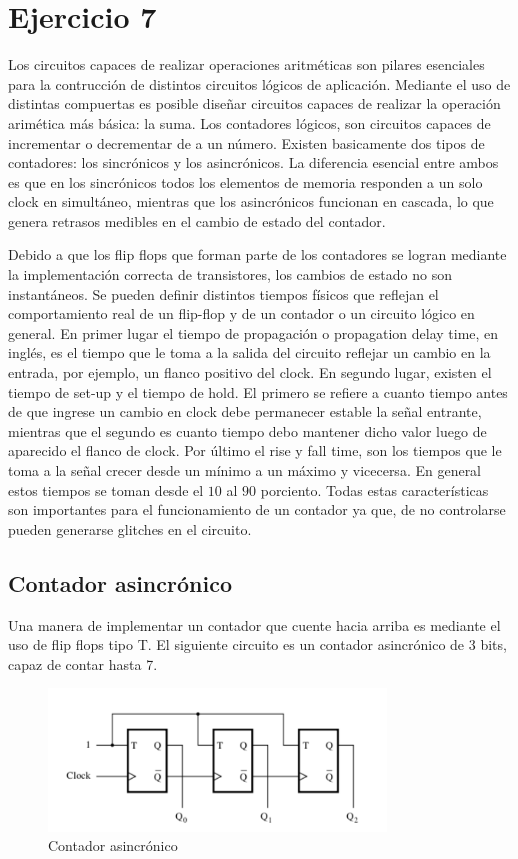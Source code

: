 \section{Ejercicio 7}
Los circuitos capaces de realizar operaciones aritméticas son pilares esenciales para la contrucción de distintos circuitos lógicos de aplicación. Mediante el uso de distintas compuertas es posible diseñar circuitos capaces de realizar la operación arimética más básica: la suma. Los contadores lógicos, son circuitos capaces de incrementar o decrementar de a un número. Existen basicamente dos tipos de contadores: los sincrónicos y los asincrónicos. La diferencia esencial entre ambos es que en los sincrónicos todos los elementos de memoria responden a un solo clock en simultáneo, mientras que los asincrónicos funcionan en cascada, lo que genera retrasos medibles en el cambio de estado del contador. 


Debido a que los flip flops que forman parte de los contadores se logran mediante la implementación correcta de transistores, los cambios de estado no son instantáneos. Se pueden definir distintos tiempos físicos que reflejan el comportamiento real de un flip-flop y de un contador o un circuito lógico en general. En primer lugar el tiempo de propagación o propagation delay time, en inglés, es el tiempo que le toma a la salida del circuito reflejar un cambio en la entrada, por ejemplo, un flanco positivo del clock. En segundo lugar, existen el tiempo de set-up y el tiempo de hold. El primero se refiere a cuanto tiempo antes de que ingrese un cambio en clock debe permanecer estable la señal entrante, mientras que el segundo es cuanto tiempo debo mantener dicho valor luego de aparecido el flanco de clock. Por último el rise y fall time, son los tiempos que le toma a la señal crecer desde un mínimo a un máximo y vicecersa. En general estos tiempos se toman desde el $10$ al $90$ porciento. Todas estas características son importantes para el funcionamiento de un contador ya que, de no controlarse pueden generarse glitches en el circuito. 

\subsection{Contador asincrónico} 

Una manera de implementar un contador que cuente hacia arriba es mediante el uso de flip flops tipo T. El siguiente circuito es un contador asincrónico de 3 bits, capaz de contar hasta 7. 

\begin{figure}[H]
	\centering
	\includegraphics[width=0.8\textwidth]{Ejercicio7/Recursos/asincronico}
	\caption{Contador asincrónico}
\end{figure}

